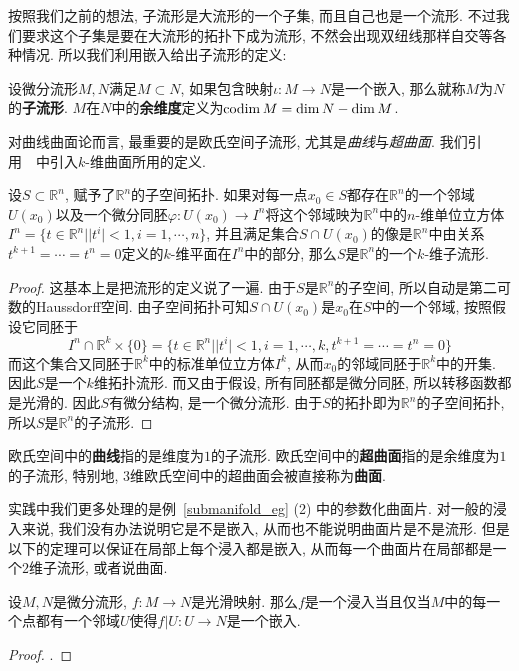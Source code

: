 按照我们之前的想法, 子流形是大流形的一个子集, 而且自己也是一个流形.
不过我们要求这个子集是要在大流形的拓扑下成为流形, 不然会出现双纽线那样自交等各种情况.
所以我们利用嵌入给出子流形的定义:
\begin{defn}
    设微分流形$M,N$满足$M\subset N$, 如果包含映射$\iota:M\to N$是一个嵌入, 那么就称$M$为$N$的\textbf{子流形}.
    $M$在$N$中的\textbf{余维度}定义为$\operatorname{codim}{M}=\dim{N}-\dim{M}$.
\end{defn}

对曲线曲面论而言, 最重要的是欧氏空间子流形, 尤其是\textit{曲线}与\textit{超曲面}.
我们引用~\parencite[8.7节定义1]{Zorich_MathAnal}~中引入$k$-维曲面所用的定义.
\begin{thm}
    设$S\subset\mathbb{R}^n$, 赋予了$\mathbb{R}^n$的子空间拓扑.
    如果对每一点$x_0\in S$都存在$\mathbb{R}^n$的一个邻域$U(x_0)$以及一个微分同胚$\varphi:U(x_0)\to I^n$将这个邻域映为$\mathbb{R}^n$中的$n$-维单位立方体$I^n=\{t\in\mathbb{R}^n||t^i|<1,i=1,\cdots,n\}$,
    并且满足集合$S\cap U(x_0)$的像是$\mathbb{R}^n$中由关系$t^{k+1}=\cdots=t^n=0$定义的$k$-维平面在$I^n$中的部分,
    那么$S$是$\mathbb{R}^n$的一个$k$-维子流形.
\end{thm}
\begin{proof}
    这基本上是把流形的定义说了一遍.
    由于$S$是$\mathbb{R}^n$的子空间, 所以自动是第二可数的Haussdorff空间.
    由子空间拓扑可知$S\cap U(x_0)$是$x_0$在$S$中的一个邻域, 按照假设它同胚于
    \[I^n\cap\mathbb{R}^k\times\{0\}=\{t\in\mathbb{R}^n||t^i|<1,i=1,\cdots,k,t^{k+1}=\cdots=t^n=0\}\]
    而这个集合又同胚于$\mathbb{R}^k$中的标准单位立方体$I^k$, 从而$x_0$的邻域同胚于$\mathbb{R}^k$中的开集.
    因此$S$是一个$k$维拓扑流形.
    而又由于假设, 所有同胚都是微分同胚, 所以转移函数都是光滑的.
    因此$S$有微分结构, 是一个微分流形.
    由于$S$的拓扑即为$\mathbb{R}^n$的子空间拓扑, 所以$S$是$\mathbb{R}^n$的子流形.
\end{proof}

\begin{defn}\label{def of curve and hypersurface}
    欧氏空间中的\textbf{曲线}指的是维度为$1$的子流形.
    欧氏空间中的\textbf{超曲面}指的是余维度为$1$的子流形, 特别地, $3$维欧氏空间中的超曲面会被直接称为\textbf{曲面}.
\end{defn}

实践中我们更多处理的是例~\ref{submanifold_eg} (2) 中的参数化曲面片.
对一般的浸入来说, 我们没有办法说明它是不是嵌入, 从而也不能说明曲面片是不是流形.
但是以下的定理可以保证在局部上每个浸入都是嵌入, 从而每一个曲面片在局部都是一个$2$维子流形, 或者说曲面.
\begin{thm}
    设$M,N$是微分流形, $f:M\to N$是光滑映射.
    那么$f$是一个浸入当且仅当$M$中的每一个点都有一个邻域$U$使得$f|U:U\to N$是一个嵌入.
\end{thm}
\begin{proof}
    \parencite[定理4.25]{Lee_IntroSmMani}.
\end{proof}


